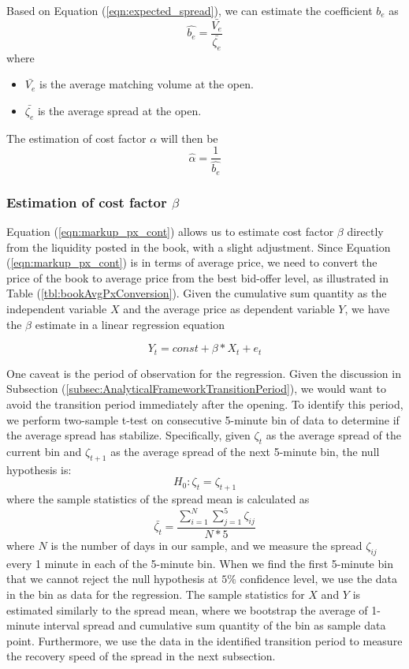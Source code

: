 \documentclass{article}
\begin{document}
Based on Equation (\ref{eqn:expected_spread}), we can estimate the coefficient $b_e$ as
\[
  \hat{b_e} = \frac{\bar{V_e}}{\bar{\zeta_e}}
\]
where
\begin{itemize}
  \item $\bar{V_e}$ is the average matching volume at the open.
  \item $\bar{\zeta_e}$ is the average spread at the open.
\end{itemize}

The estimation of cost factor $\alpha$ will then be
\[
  \hat{\alpha} = \frac{1}{\hat{b_e}}
\]

\subsubsection{Estimation of cost factor $\beta$}

Equation (\ref{eqn:markup_px_cont}) allows us to estimate cost factor $\beta$ directly from the liquidity posted in the book, with a slight adjustment. Since Equation (\ref{eqn:markup_px_cont}) is in terms of average price, we need to convert the price of the book to average price from the best bid-offer level, as illustrated in Table (\ref{tbl:bookAvgPxConversion}). Given the cumulative sum quantity as the independent variable $X$ and the average price as dependent variable $Y$, we have the $\beta$ estimate in a linear regression equation

\[
  Y_t = const + \beta * X_t + e_t
\]

One caveat is the period of observation for the regression. Given the discussion in Subsection (\ref{subsec:AnalyticalFrameworkTransitionPeriod}), we would want to avoid the transition period immediately after the opening. To identify this period, we perform two-sample t-test on consecutive 5-minute bin of data to determine if the average spread has stabilize. Specifically, given $\zeta_t$ as the average spread of the current bin and $\zeta_{t+1}$ as the average spread of the next 5-minute bin, the null hypothesis is:
\[
  H_0: \zeta_t = \zeta_{t+1}
\]
where the sample statistics of the spread mean is calculated as
\[
  \bar{\zeta_t} = \frac{\sum_{i=1}^N  \sum_{j=1}^5 \zeta_{ij}}{N*5}
\]
where $N$ is the number of days in our sample, and we measure the spread $\zeta_{ij}$ every 1 minute in each of the 5-minute bin. When we find the first 5-minute bin that we cannot reject the null hypothesis at $5 \%$ confidence level, we use the data in the bin as data for the regression. The sample statistics for $X$ and $Y$ is estimated similarly to the spread mean, where we bootstrap the average of 1-minute interval spread and cumulative sum quantity of the bin as sample data point. Furthermore, we use the data in the identified transition period to measure the recovery speed of the spread in the next subsection.
\end{document}
